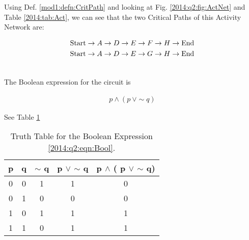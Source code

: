\begin{subquestions}
\begin{subsubquestions}

\subsubquestion

Using Def. \ref{mod1:defn:CritPath} and looking at Fig. \ref{2014:q2:fig:ActNet} and Table \ref{2014:tab:Act}, we can see that the two Critical Paths of this Activity Network are:

\begin{align}
	\text{Start} \rightarrow A \rightarrow D \rightarrow E \rightarrow F \rightarrow H \rightarrow \text{End} \nonumber \\
	\text{Start} \rightarrow A \rightarrow D \rightarrow E \rightarrow G \rightarrow H \rightarrow \text{End} \nonumber \\ \nonumber
\end{align}
	
\end{subsubquestions}


\subquestion

\begin{subsubquestions}
	
\subsubquestion

The Boolean expression for the circuit is 

\begin{align}
	p \wedge (p \: \vee \sim q) \label{2014:q2:eqn:Bool}
\end{align}


\subsubquestion

See Table \ref{2014:tab:TrthTab}

\begin{table}[ht]
	\centering
	\begin{tabular}{|c|c|c|c|c|}
		\hline
		p&q& $\sim$ q & p $\vee$ $\sim$ q& p $\wedge$ ( p $\vee$ $\sim$ q) \\
		\hline
		0 & 0 & 1 & 1 & 0 \\
		0 & 1 & 0 & 0 & 0 \\
		1 & 0 & 1 & 1 & 1 \\
		1 & 1 & 0 & 1 & 1 \\
		\hline
	\end{tabular}
	\caption{\label{2014:tab:TrthTab} Truth Table for the Boolean Expression \ref{2014:q2:eqn:Bool}.}
\end{table}

\end{subsubquestions}

\end{subquestions}
